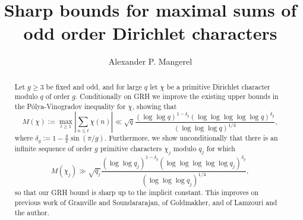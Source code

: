 \documentclass[10pt]{amsart}
\theoremstyle{definition}
\begin{document}
\title{Sharp bounds for maximal sums of odd order Dirichlet characters}
\author{Alexander P. Mangerel}
\address{Department of Mathematical Sciences, Durham University, Stockton Road, Durham, DH1 3LE, UK}

\begin{abstract}
Let $g \geq 3$ be fixed and odd, and for large $q$ let $\chi$ be a primitive Dirichlet character modulo $q$ of order $g$. Conditionally on GRH we improve the existing upper bounds in the P\'{o}lya-Vinogradov inequality for $\chi$, showing that
$$
M(\chi) := \max_{t \geq 1} \left|\sum_{n \leq t} \chi(n) \right| \ll \sqrt{q} \frac{(\log\log q)^{1-\delta_g} (\log\log\log\log\log q)^{\delta_g}}{(\log\log\log q)^{1/4}},
$$ 
where $\delta_g := 1-\tfrac{g}{\pi}\sin(\pi/g)$. Furthermore, we show unconditionally that there is an infinite sequence of order $g$ primitive characters $\chi_j$ modulo $q_j$ for which
$$
M(\chi_j) \gg \sqrt{q_j} \frac{(\log\log q_j)^{1-\delta_g} (\log\log\log\log\log q_j)^{\delta_g}}{(\log\log\log q_j)^{1/4}},
$$
so that our GRH bound is sharp up to the implicit constant. This improves on previous work of Granville and Soundararajan, of Goldmakher, and of Lamzouri and the author. 
\end{abstract}
\maketitle
\end{document}
